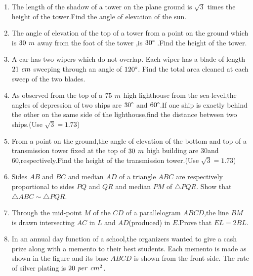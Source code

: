 \documentclass{article}
\begin{document}
\begin{enumerate}
\item The length of the shadow of a tower on the plane ground is $\sqrt{3}$ times the height of the tower.Find the angle of elevation of the sun.

\item  The angle of elevation of the top of a tower from a point on the ground which is $30\hspace{4 pt} m$ away from the foot of the tower ,is $30\degree$ .Find the height of the tower.

\item  A car has two wipers which do not overlap. Each wiper has a blade of length $21\hspace{4 pt} cm$ sweeping through an angle of $120\degree$. Find the total area cleaned at each sweep of the two blades.

\item  As observed from the top of a $75\hspace{4 pt} m$ high lighthouse from the sea-level,the angles of depression of two ships are $30\degree$ and $60\degree$.If one ship is exactly behind the other on the same side of the lighthouse,find the distance between two ships.(Use $\sqrt{3} = 1.73$)

\item  From a point on the ground,the angle of elevation of the bottom and top of a transmission tower fixed at the top of $30\hspace{4 pt} m$ high building are 30\degree and 60\degree ,respectively.Find the height of the transmission tower.(Use $\sqrt{3} = 1.73$)
    
\item Sides $AB$ and $BC$ and median $AD$ of a triangle $ABC$ are respectively proportional to sides $PQ$ and $QR$ and median $PM$ of $\triangle PQR$. Show that $\triangle ABC \sim \triangle PQR$. 

\item  Through the mid-point $M$ of the $CD$ of a parallelogram $ABCD$,the line $BM$ is drawn intersecting $AC$ in $L$ and $AD$(produced) in $E$.Prove that $EL=2BL$.

\item  In an annual day function of a school,the organizers wanted to give a cash prize along with a memento to their best students. Each memento is made as shown in  the figure and its base $ABCD$ is shown from the front side. The rate of silver plating is \rupee \hspace{4 pt} $20 \hspace{4 pt} per \hspace{ 4 pt}  cm^2$.


\end{enumerate}
\end{document}
